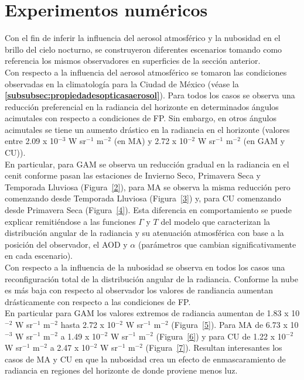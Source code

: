 \newpage

\section{Experimentos numéricos}

Con el fin de inferir la influencia del aerosol atmosférico y la nubosidad en el brillo del cielo nocturno, se construyeron diferentes escenarios tomando como referencia los mismos observadores en superficies de la sección anterior.\\

Con respecto a la influencia del aerosol atmosférico se tomaron las condiciones observadas en la climatología para la Ciudad de México (véase la \textbf{\autoref{subsubsec:propiedadesopticasaerosol}}). Para todos los casos se observa una reducción preferencial en la radiancia del horizonte en determinados ángulos acimutales con respecto a condiciones de FP. Sin embargo, en otros ángulos acimutales se tiene un aumento drástico en la radiancia en el horizonte (valores entre 2.09 x 10$^{-3}$ W sr$^{-1}$ m$^{-2}$ (en MA) y 2.72 x 10$^{-2}$ W sr$^{-1}$ m$^{-2}$ (en GAM y CU)).\\

En particular, para GAM se observa un reducción gradual en la radiancia en el cenit conforme pasan las estaciones de Invierno Seco, Primavera Seca y Temporada Lluviosa (Figura~\ref{2}), para MA se observa la misma reducción pero comenzando desde Temporada Lluviosa (Figura~\ref{3}) y, para CU comenzando desde Primavera Seca (Figura~\ref{4}). Esta diferencia en comportamiento se puede explicar remitiéndose a las funciones $\Gamma$ y $T$ del modelo que caracterizan la distribución angular de la radiancia y su atenuación atmosférica con base a la posición del observador, el AOD y $\alpha$ (parámetros que cambian significativamente en cada escenario).\\

Con respecto a la influencia de la nubosidad se observa en todos los casos una reconfiguración total de la distribución angular de la radiancia. Conforme la nube es más baja con respecto al observador los valores de randiancia aumentan drásticamente con respecto a las condiciones de FP.\\

En particular para GAM los valores extremos de radiancia aumentan de 1.83 x 10$^{-2}$ W sr$^{-1}$ m$^{-2}$ hasta 2.72 x 10$^{-2}$ W sr$^{-1}$ m$^{-2}$ (Figura~\ref{5}). Para MA de 6.73 x 10$^{-3}$ W sr$^{-1}$ m$^{-2}$ a 1.49 x 10$^{-2}$ W sr$^{-1}$ m$^{-2}$ (Figura~\ref{6}) y para CU de 1.22 x 10$^{-2}$ W sr$^{-1}$ m$^{-2}$ a 2.47 x 10$^{-2}$ W sr$^{-1}$ m$^{-2}$ (Figura~\ref{7}). Resultan interesantes los casos de MA y CU en que la nubosidad crea un efecto de enmascaramiento de radiancia en regiones del horizonte de donde proviene menos luz.\\

